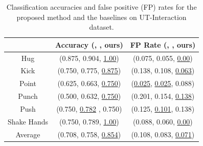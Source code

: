 \documentclass[10pt,twocolumn,letterpaper]{article}
\begin{document}
\begin{table}[ht]
\centering \caption{Classification accuracies and false positive (FP) rates for the proposed method and the baselines on UT-Interaction dataset.}
\footnotesize{
\begin{tabular}{|c||c|c|}
\hline   & Accuracy (\cite{Ryoo:group}, \cite{Amer:group}, ours) & FP Rate (\cite{Ryoo:group}, \cite{Amer:group}, ours) \\
\hline Hug &  (0.875, 0.904, \underline{1.00}) & (0.075, 0.055, \underline{0.00}) \\
\hline Kick &  (0.750, 0.775, \underline{0.875})  & (0.138, 0.108, \underline{0.063})\\
\hline Point & (0.625, 0.663,  \underline{0.750}) & (\underline{0.025}, \underline{0.025}, 0.088)\\
\hline Punch & (0.500, 0.632, \underline{0.750})  & (0.201, 0.154,  \underline{0.138})\\
\hline Push & (0.750, \underline{0.782} , 0.750)  & (0.125, \underline{0.101},  0.138)\\
\hline Shake Hands &  (0.750, 0.789, \underline{1.00}) & (0.088, 0.060, \underline{0.00}) \\
\hline\hline Average &  (0.708, 0.758, \underline{0.854})  & (0.108, 0.083,  \underline{0.071})\\
\hline 
\end{tabular}
}
\label{UTaccuFP}
\end{table}
\end{document}

